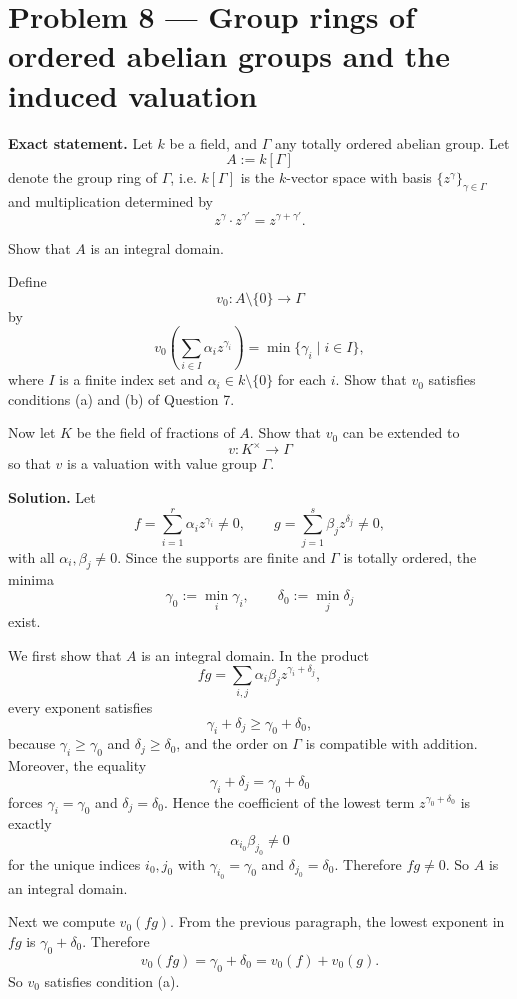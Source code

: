 \documentclass[12pt,a4paper,oneside]{report}
\theoremstyle{notespace}
\begin{document}
\section{Problem 8 --- Group rings of ordered abelian groups and the induced valuation}

\textbf{Exact statement.}
Let \(k\) be a field, and \(\Gamma\) any totally ordered abelian group. Let
\[
A:=k[\Gamma]
\]
denote the group ring of \(\Gamma\), i.e. \(k[\Gamma]\) is the \(k\)-vector space with basis \(\{z^\gamma\}_{\gamma\in\Gamma}\) and multiplication determined by
\[
z^\gamma\cdot z^{\gamma'}=z^{\gamma+\gamma'}.
\]

Show that \(A\) is an integral domain.

Define
\[
v_0:A\setminus\{0\}\to \Gamma
\]
by
\[
v_0\!\left(\sum_{i\in I}\alpha_i z^{\gamma_i}\right)=\min\{\gamma_i\mid i\in I\},
\]
where \(I\) is a finite index set and \(\alpha_i\in k\setminus\{0\}\) for each \(i\). Show that \(v_0\) satisfies conditions (a) and (b) of Question 7.

Now let \(K\) be the field of fractions of \(A\). Show that \(v_0\) can be extended to
\[
v:K^\times\to \Gamma
\]
so that \(v\) is a valuation with value group \(\Gamma\).

\textbf{Solution.}
Let
\[
f=\sum_{i=1}^r \alpha_i z^{\gamma_i}\neq 0,\qquad
g=\sum_{j=1}^s \beta_j z^{\delta_j}\neq 0,
\]
with all \(\alpha_i,\beta_j\neq 0\). Since the supports are finite and \(\Gamma\) is totally ordered, the minima
\[
\gamma_0:=\min_i\gamma_i,\qquad \delta_0:=\min_j\delta_j
\]
exist.

We first show that \(A\) is an integral domain. In the product
\[
fg=\sum_{i,j}\alpha_i\beta_j z^{\gamma_i+\delta_j},
\]
every exponent satisfies
\[
\gamma_i+\delta_j\ge \gamma_0+\delta_0,
\]
because \(\gamma_i\ge \gamma_0\) and \(\delta_j\ge \delta_0\), and the order on \(\Gamma\) is compatible with addition. Moreover, the equality
\[
\gamma_i+\delta_j=\gamma_0+\delta_0
\]
forces \(\gamma_i=\gamma_0\) and \(\delta_j=\delta_0\). Hence the coefficient of the lowest term \(z^{\gamma_0+\delta_0}\) is exactly
\[
\alpha_{i_0}\beta_{j_0}\neq 0
\]
for the unique indices \(i_0,j_0\) with \(\gamma_{i_0}=\gamma_0\) and \(\delta_{j_0}=\delta_0\). Therefore \(fg\neq 0\). So \(A\) is an integral domain.

Next we compute \(v_0(fg)\). From the previous paragraph, the lowest exponent in \(fg\) is \(\gamma_0+\delta_0\). Therefore
\[
v_0(fg)=\gamma_0+\delta_0=v_0(f)+v_0(g).
\]
So \(v_0\) satisfies condition (a).
\end{document}
